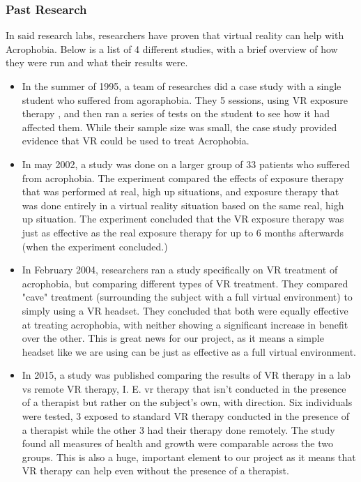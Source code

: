 \documentclass[a4paper,10pt]{article}
\begin{document}
\subsubsection{Past Research}
In said research labs, researchers have proven that virtual reality can help with Acrophobia.  Below is a list of 4 different studies, with a brief overview of how they were run and what their results were.
\begin{itemize}
	\item In the summer of 1995, a team of researches did a case study with a single student who suffered from agoraphobia.  They 5 sessions, using VR exposure therapy , and then ran a series of tests on the student to see how it had affected them.  While their sample size was small, the case study provided evidence that VR could be used to treat Acrophobia.\cite{phobiaOne}
	\item In may 2002, a study was done on a larger group of 33 patients who suffered from acrophobia.  The experiment compared the effects of exposure therapy that was performed at real, high up situations, and exposure therapy that was done entirely in a virtual reality situation based on the same real, high up situation.  The experiment concluded that the VR exposure therapy was just as effective as the real exposure therapy for up to 6 months afterwards (when the experiment concluded.)\cite{phobiaTwo}
	\item In February 2004, researchers ran a study specifically on VR treatment of acrophobia, but comparing different types of VR treatment. They compared "cave" treatment (surrounding the subject with a full virtual environment) to simply using a VR headset.   They concluded that both were equally effective at treating acrophobia, with neither showing a significant increase in benefit over the other.  This is great news for our project, as it means a simple headset like we are using can be just as effective as a full virtual environment.\cite{phobiaThree}
	\item In 2015, a study was published comparing the results of VR therapy in a lab vs remote VR therapy, I. E. vr therapy that isn't conducted in the presence of a therapist but rather on the subject's own, with direction.  Six individuals were tested, 3 exposed to standard VR therapy conducted in the presence of a therapist while the other 3 had their therapy done remotely.  The study found all measures of health and growth were comparable across the two groups. This is also a huge, important element to our project as it means that VR therapy can help even without the presence of a therapist.\cite{phobiaFour}
\end{itemize}
\end{document}
